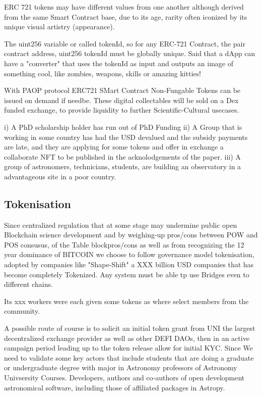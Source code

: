 \documentclass[final,5p,times,twocolumn,authoryear]{elsarticle}
\begin{document}
ERC 721 tokens may have different values from one another although derived from the same Smart Contract base, due to its age, rarity often iconized by its unique visual artistry (appearance).

The uint256 variable or called tokenId, so for any ERC-721 Contract, the pair contract address, uint256 tokenId must be globally unique. Said that a dApp can have a "converter" that uses the tokenId as input and outputs an image of something cool, like zombies, weapons, skills or amazing kitties!


With PAOP protocol ERC721 SMart Contract Non-Fungable Tokens can be issued on demand if needbe. These digital collectables will be sold on a Dex funded exchange, to provide liquidity to further Scientific-Cultural usecases.

i) A PhD scholarship holder has run out of PhD Funding 
ii) A Group that is working in some country has had the USD devalued and the subsidy payments are late, and they are applying for some tokens and offer in exchange a collaborate NFT to be published in the acknolodgements of the paper.
iii) A group of astronomers, technicians, students,  are building an observatory in a advantageous site in a poor country. 

\subsection{Tokenisation}

Since centralized regulation that at some stage may undermine public open Blockchain science development and by weighing-up pros/cons between POW and POS consusus, of the Table blockpros/cons as well as from recognizing the 12 year dominance of BITCOIN we choose to follow governance model tokenisation, adopted by  companies like "Shape-Shift" a XXX billion USD companies that has become completely Tokenized. Any system must be able tp use Bridges even to different chains. 

Its xxx workers were each given some tokens as where select members from the community. 

A possible route of course is to solicit an initial token grant from UNI the largest decentralized exchange provider as well as other DEFI DAOs, then in an active campaign period leading up to the token release allow for initial KYC. Since We need to validate some key actors that include students that are doing a graduate or undergraduate degree with major in Astronomy professors of Astronomy Univsersity Courses. Developers, authors and co-authors of open development astronomical software, including those of affiliated packages in Astropy. 
\end{document}
